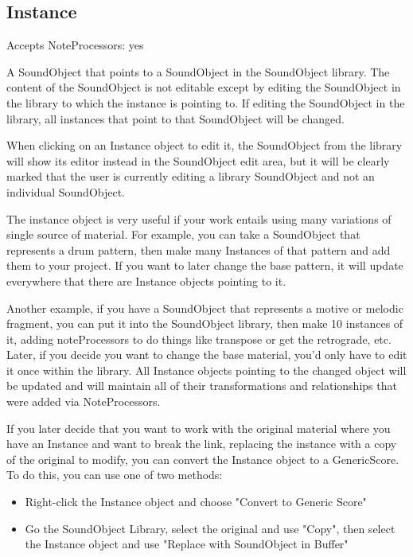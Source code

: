 \subsection{Instance}\label{instanceObject}

Accepts NoteProcessors: yes

A SoundObject that points to a SoundObject in the SoundObject library.
The content of the SoundObject is not editable except by editing the
SoundObject in the library to which the instance is pointing to. If
editing the SoundObject in the library, all instances that point to that
SoundObject will be changed.

When clicking on an Instance object to edit it, the SoundObject from the
library will show its editor instead in the SoundObject edit area, but
it will be clearly marked that the user is currently editing a library
SoundObject and not an individual SoundObject.

The instance object is very useful if your work entails using many
variations of single source of material. For example, you can take a
SoundObject that represents a drum pattern, then make many Instances of
that pattern and add them to your project. If you want to later change
the base pattern, it will update everywhere that there are Instance
objects pointing to it.

Another example, if you have a SoundObject that represents a motive or
melodic fragment, you can put it into the SoundObject library, then make
10 instances of it, adding noteProcessors to do things like transpose or
get the retrograde, etc. Later, if you decide you want to change the
base material, you'd only have to edit it once within the library. All
Instance objects pointing to the changed object will be updated and will
maintain all of their transformations and relationships that were added
via NoteProcessors.

If you later decide that you want to work with the original material
where you have an Instance and want to break the link, replacing the
instance with a copy of the original to modify, you can convert the
Instance object to a GenericScore. To do this, you can use one of two
methods:

\begin{itemize}
\tightlist
\item
  Right-click the Instance object and choose "Convert to Generic Score"
\item
  Go the SoundObject Library, select the original and use "Copy", then
  select the Instance object and use "Replace with SoundObject in
  Buffer"
\end{itemize}
